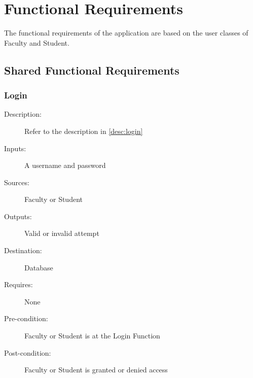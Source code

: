 %
%



\section{Functional Requirements}
The functional requirements of the application are based on the user classes of
Faculty and Student.
\subsection{Shared Functional Requirements}

\subsubsection{\large Login} 
\begin{boxed} %
\begin{description}
\item[Description:]
   Refer to the description in \autoref{desc:login}
\item[Inputs:]
   A username and password
\item[Sources:]
   Faculty or Student
\item[Outputs:]
   Valid or invalid attempt
\item[Destination:]
   Database
\item[Requires:]
   None
\item[Pre-condition:]
   Faculty or Student is at the Login Function
\item[Post-condition:]
   Faculty or Student is granted or denied access
\end{description}
\end{boxed} %


